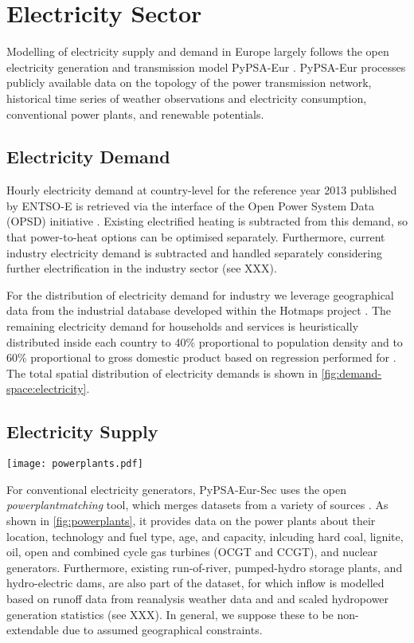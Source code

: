 \section{Electricity Sector}
\label{sec:si:electricity}

Modelling of electricity supply and demand in Europe largely follows the open
electricity generation and transmission model PyPSA-Eur
. PyPSA-Eur processes publicly available data on
the topology of the power transmission network, historical time series of
weather observations and electricity consumption, conventional power plants, and
renewable potentials.

\subsection{Electricity Demand}
\label{sec:si:electricity:demand}

Hourly electricity demand at country-level for the reference year 2013 published
by ENTSO-E is retrieved via the interface of the Open Power System Data (OPSD)
initiative \citeS{}. Existing electrified heating is subtracted from this
demand, so that power-to-heat options can be optimised separately. Furthermore,
current industry electricity demand is subtracted and handled separately
considering further electrification in the industry sector (see XXX).

For the distribution of electricity demand for industry we leverage geographical
data from the industrial database developed within the Hotmaps project \citeS{}.
The remaining electricity demand for households and services is heuristically
distributed inside each country to 40\% proportional to population density and
to 60\% proportional to gross domestic product based on regression performed for
. The total spatial distribution of electricity
demands is shown in \cref{fig:demand-space:electricity}.

\subsection{Electricity Supply}

\begin{SCfigure}
    \caption{Powerplants.}
    \label{fig:powerplants}
    \texttt{[image: powerplants.pdf]}
\end{SCfigure}

For conventional electricity generators, PyPSA-Eur-Sec uses the open
\textit{powerplantmatching} tool, which merges datasets from a variety of
sources . As shown in \cref{fig:powerplants}, it
provides data on the power plants about their location, technology and fuel
type, age, and capacity, inlcuding hard coal, lignite, oil, open and combined
cycle gas turbines (OCGT and CCGT), and nuclear generators. Furthermore,
existing run-of-river, pumped-hydro storage plants, and hydro-electric dams, are
also part of the dataset, for which inflow is modelled based on runoff data from
reanalysis weather data and and scaled hydropower generation statistics (see
XXX). In general, we suppose these to be non-extendable due to assumed
geographical constraints.

